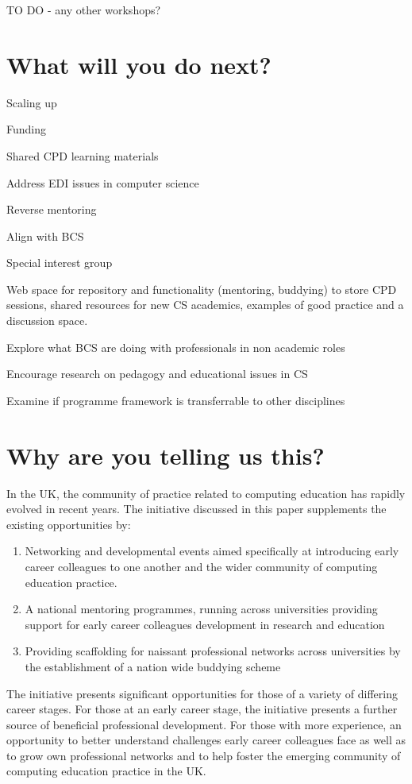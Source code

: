 \documentclass[sigconf]{acmart}
\begin{document}
TO DO - any other workshops?

\section{What will you do next?}

Scaling up


Funding 


Shared CPD learning materials


Address EDI issues in computer science


Reverse mentoring


Align with BCS


Special interest group

Web space for repository and functionality (mentoring, buddying) to store CPD sessions, shared resources for new CS academics, examples of good practice and a discussion space.

Explore what BCS are doing with professionals in non academic roles

Encourage research on pedagogy and educational issues in CS

Examine if programme framework is transferrable to other disciplines
\section{Why are you telling us this?}
In the UK, the community of practice related to computing education has rapidly evolved in recent years. The initiative discussed in this paper supplements the existing opportunities by:
\begin{enumerate}
	\item Networking and developmental events aimed specifically at introducing early career colleagues to one another and the wider community of computing education practice.
	\item A national mentoring programmes, running across universities providing support for early career colleagues development in research and education
	\item Providing scaffolding for naissant professional networks across universities by the establishment of a nation wide buddying scheme 
\end{enumerate}

The initiative presents significant opportunities for those of a variety of differing career stages. For those at an early career stage, the initiative presents a further source of beneficial professional development. For those with more experience, an opportunity to better understand challenges early career colleagues face as well as to grow own professional networks and to help foster the emerging community of computing education practice in the UK. 
\end{document}
